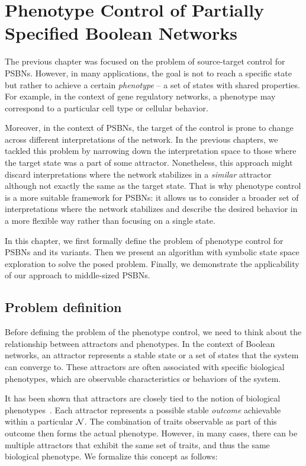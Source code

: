 \chapter{Phenotype Control of Partially Specified Boolean Networks}
\label{chapter:phenotype_control_psbn}

The previous chapter was focused on the problem of source-target control for PSBNs. However, in many applications, the goal is not to reach a specific state but rather to achieve a certain \emph{phenotype} -- a set of states with shared properties. For example, in the context of gene regulatory networks, a phenotype may correspond to a particular cell type or cellular behavior.

Moreover, in the context of PSBNs, the target of the control is prone to change across different interpretations of the network. In the previous chapters, we tackled this problem by narrowing down the interpretation space to those where the target state was a part of some attractor. Nonetheless, this approach might discard interpretations where the network stabilizes in a \emph{similar} attractor although not exactly the same as the target state. That is why phenotype control is a more suitable framework for PSBNs: it allows us to consider a broader set of interpretations where the network stabilizes and describe the desired behavior in a more flexible way rather than focusing on a single state.

In this chapter, we first formally define the problem of phenotype control for PSBNs and its variants. Then we present an algorithm with symbolic state space exploration to solve the posed problem. Finally, we demonstrate the applicability of our approach to middle-sized PSBNs.


\section{Problem definition}
\label{s:phenotype_problem_definition}

Before defining the problem of the phenotype control, we need to think about the relationship between attractors and phenotypes. In the context of Boolean networks, an attractor represents a stable state or a set of states that the system can converge to. These attractors are often associated with specific biological phenotypes, which are observable characteristics or behaviors of the system.


It has been shown that attractors are closely tied to the notion of biological phenotypes~\cite{Klarner2018,Fontanals2022b}. Each attractor represents a possible stable \emph{outcome} achievable within a particular $\mathcal{N}$. The combination of traits observable as part of this outcome then forms the actual phenotype. However, in many cases, there can be multiple attractors that exhibit the same set of traits, and thus the same biological phenotype. We formalize this concept as follows:

